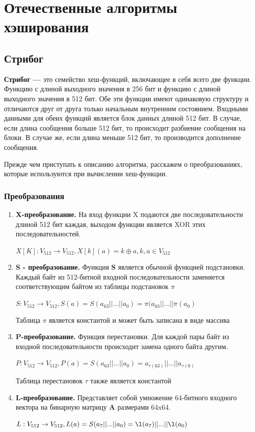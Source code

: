 \documentclass[a4paper,14pt]{report}
\begin{document}
\chapter{Отечественные алгоритмы хэширования}
\section{Стрибог}
\textbf{Стрибог —} это семейство хеш-функций, включающее в себя всего две функции. Функцию с длиной выходного значения в 256 бит и функцию с длиной выходного значения в 512 бит. Обе эти функции имеют одинаковую структуру и отличаются друг от друга только начальным внутренним состоянием. Входными данными для обеих функций является блок данных длиной 512 бит. В случае, если длина сообщения больше 512 бит, то происходит разбиение сообщения на блоки. В случае же, если длина меньше 512 бит, то производится дополнение сообщения.

Прежде чем приступать к описанию алгоритма, расскажем о преобразованиях, которые используются при вычислении хеш-функции.
\subsection{Преобразования}

\begin{enumerate}
  \item \textbf{X-преобразование.} На вход функции X подаются две последовательности длиной 512 бит каждая, выходом функции является XOR этих последовательностей.
  
  $X[K] : V_{512} \rightarrow V_{512},     X[k](a) = k \oplus a, k, a \in V_{512}$
  
  \item \textbf{S - преобразование.} Функция \textbf{S} является обычной функцией подстановки. Каждый байт из 512-битной входной последовательности заменяется соответствующим байтом из таблицы подстановок $\pi$
  
   $S : V_{512} \rightarrow V_{512},    S(a) = S(a_{63}||...||a_0) = \pi(a_{63}||...||\pi(a_0)$
   
   Таблица $\pi$ является константой и может быть записана в виде массива
   
   \item \textbf{P-преобразование.} Функция перестановки. Для каждой пары байт из входной последовательности происходит замена одного байта другим. 
   
    $P : V_{512} \rightarrow V_{512},    P(a) = S(a_{63}||...||a_0) = a_{\tau(63)}||...||a_{\tau(0)}$
    
    Таблица перестановок $\tau$ также является константой
    
    \item \textbf{L-преобразование.} Представляет собой умножение 64-битного входного вектора на бинарную матрицу \textbf{A} размерами 64x64.
    
        $L : V_{512} \rightarrow V_{512},    L(a) = S(a_{7}||...||a_0) = \l(a_7)||...||\l(a_0)$
  \end{enumerate}
  
\end{document}
